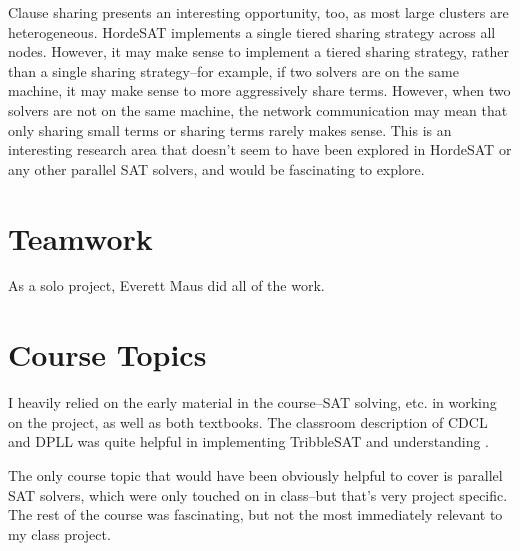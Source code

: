 \documentclass[10pt]{article}
\begin{document}
  Clause sharing presents an interesting opportunity, too, as most large clusters are heterogeneous.  HordeSAT \cite{hordesat} implements a single tiered sharing strategy across all nodes.  However, it may make sense to implement a tiered sharing strategy, rather than a single sharing strategy--for example, if two solvers are on the same machine, it may make sense to more aggressively share terms.  However, when two solvers are not on the same machine, the network communication may mean that only sharing small terms or sharing terms rarely makes sense.  This is an interesting research area that doesn't seem to have been explored in HordeSAT or any other parallel SAT solvers, and would be fascinating to explore.

\section{Teamwork}

As a solo project, Everett Maus did all of the work.

\section{Course Topics}

I heavily relied on the early material in the course--SAT solving, etc. in working on the project, as well as both textbooks.  The classroom description of CDCL and DPLL was quite helpful in implementing TribbleSAT and understanding .

The only course topic that would have been obviously helpful to cover is parallel SAT solvers, which were only touched on in class--but that's very project specific.  The rest of the course was fascinating, but not the most
immediately relevant to my class project.

\printbibliography[title={Bibliography}]
\end{document}
